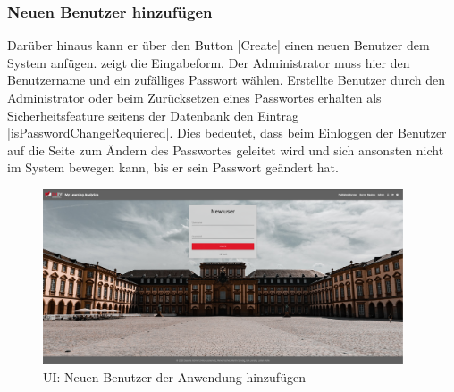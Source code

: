 \subsubsection*{Neuen Benutzer hinzufügen \faUsers}

Darüber hinaus kann er über den Button \jinline|Create| einen neuen Benutzer dem System anfügen. 
\abb {} zeigt die Eingabeform. 
Der Administrator muss hier den Benutzername und ein zufälliges Passwort wählen. 
Erstellte Benutzer durch den Administrator oder beim Zurücksetzen eines Passwortes erhalten als Sicherheitsfeature seitens der Datenbank  den Eintrag \jinline|isPasswordChangeRequiered|. 
Dies bedeutet, dass beim Einloggen der Benutzer auf die Seite zum Ändern des Passwortes geleitet wird und sich ansonsten nicht im System bewegen kann, bis er sein Passwort geändert hat. 

\begin{figure}[hp]
	\centering
	\includegraphics[width=0.95\textwidth, keepaspectratio]{img/client/AdminCreateUser.png}
	\captionsetup{justification=centering, format=plain}
	\caption[\acf{UI}: Neuen Benutzer der Anwendung hinzufügen]{\acf{UI}: Neuen Benutzer der Anwendung hinzufügen \\ \quelleScreenshot}
	\label{fig:AdminCreateUserImplement}
\end{figure}

